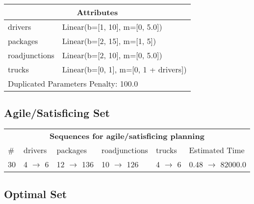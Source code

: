 \documentclass{article}
\begin{document}
                    \begin{center}
                    \begin{tabular}{@{}p{}p{}@{}}
                    \multicolumn{2}{c}{\bf \large Attributes}\\\midrule
                    drivers & Linear(b=[1, 10], m=[0, 5.0])\\
packages & Linear(b=[2, 15], m=[1, 5])\\
roadjunctions & Linear(b=[2, 10], m=[0, 5.0])\\
trucks & Linear(b=[0, 1], m=[0, 1 + drivers])
                    
                     \\\midrule
                    \multicolumn{2}{l}{Duplicated Parameters Penalty: 100.0}
                    \end{tabular}
                    \end{center}
                
                         \subsection*{Agile/Satisficing Set}

                        \begin{center}
                        \begin{tabular}{@{}l|l|l|l|l|l@{}}
                        \multicolumn{6}{c}{\bf \large Sequences for agile/satisficing planning}\\
                        \# & drivers & packages & roadjunctions & trucks & Estimated Time\\\midrule
                        30&4 $\rightarrow$ 6&12 $\rightarrow$ 136&10 $\rightarrow$ 126&4 $\rightarrow$ 6&0.48 $\rightarrow$ 82000.0
                        \end{tabular}
                        \end{center}
                    
                            \subsection*{Optimal Set}
\end{document}
